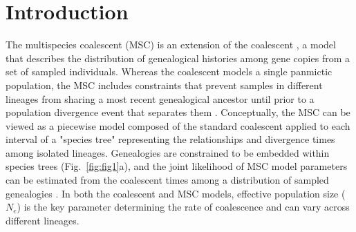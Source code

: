 \documentclass[11pt]{article}
\begin{document}
\section{Introduction}


The multispecies coalescent (MSC) is an extension of the coalescent 
\citep{kingman1982coalescent}, a model that describes the distribution of genealogical 
histories among gene copies from a set of sampled individuals. Whereas the 
coalescent models a single panmictic population, the MSC includes constraints that prevent 
samples in different lineages from sharing a most recent genealogical ancestor until prior
to a population divergence event that separates them \citep{maddison1997gene,maddison2006inferring}. 
Conceptually, the MSC can be viewed as a piecewise model composed of the standard
coalescent applied to each interval of a "species tree" representing the relationships
and divergence times among isolated lineages. Genealogies are constrained to be
embedded within species trees (Fig.~\ref{fig:fig1}a), and the joint likelihood of 
MSC model parameters can be estimated from the coalescent times among a 
distribution of sampled genealogies
% 
\citep{rannala2003bayes,degnan2009gene}. In both the coalescent
and MSC models, effective population size ($N_e$) is the key parameter determining 
the rate of coalescence and can vary across different lineages. 
\end{document}
